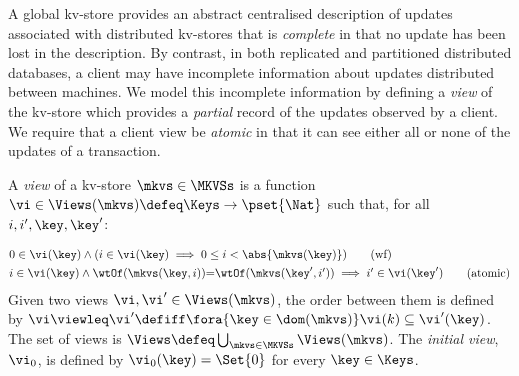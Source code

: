 A global kv-store provides an abstract centralised description of
updates associated with distributed kv-stores that is \emph{complete} in 
that no update has been lost in the description. By contrast, in
both replicated and partitioned distributed databases, a client may
have incomplete information about updates distributed between
machines.  We model this incomplete information by
defining a {\em view} of the kv-store which provides a {\em
  partial} record of the updates observed by a client. We require that a client view be {\em atomic} in that it can
see either all or none of the updates of a transaction.



\begin{definition}[Views]
\label{def:view}
\label{def:cuts}
\label{def:views}
\label{def:configuration}
A \emph{view} of a kv-store $\mkvs \in \MKVSs$ is a function
$\vi \in \Views(\mkvs) \defeq \Keys \to\pset{\Nat}$ such that, for all $i, i', \key, \key'$:
%

\vspace{-5pt}
{%
\displaymathfont
\begin{align*}
    & 
    0 \in \vi(\key) 
    \land (i \in \vi(\key) \implies 0 \leq i < \abs{ \mkvs(\key) }) 
    \tag{wf}
    \label{eq:view.wf}\\
    & 
    \begin{array}{@{}l@{}}
	i \in \vi(\key)  
  	\land \wtOf(\mkvs(\key, i)) {=} \wtOf(\mkvs(\key', i'))  
  	\implies i' \in \vi(\key')
    \end{array}
	\tag{atomic}
	\label{eq:view.atomic}
\end{align*}
}%
Given two views $\vi, \vi' \in \Views(\mkvs)$, 
the order between them is defined by $\vi \viewleq \vi' \defiff \fora{\key \in \dom(\mkvs)} \vi(k) \subseteq \vi'(\key)$.
The set of views is $\Views \defeq \bigcup_{\mkvs \in \MKVSs} \Views(\mkvs)$.
%
\noindent The \emph{initial view}, $\vi_{0}$,  is defined by
$\vi_{0}(\key) = \Set{0}$ for every $\key \in \Keys$. 
\end{definition}

